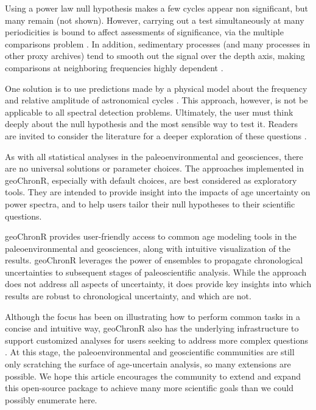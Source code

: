 \documentclass[gchron, manuscript]{copernicus}
\begin{document}
Using a power law null hypothesis makes a few cycles appear non
significant, but many remain (not shown). However, carrying out a test
simultaneously at many periodicities is bound to affect assessments of
significance, via the multiple comparisons problem
\citep{Vaughan_PP2011}. In addition, sedimentary processes (and many
processes in other proxy archives) tend to smooth out the signal over
the depth axis, making comparisons at neighboring frequencies highly
dependent \citep{Meyers_2012}.

One solution is to use predictions made by a physical model about the
frequency and relative amplitude of astronomical cycles
\citep{MeyersSageman_2007}. This approach, however, is not be applicable
to all spectral detection problems. Ultimately, the user must think
deeply about the null hypothesis and the most sensible way to test it.
Readers are invited to consider the literature for a deeper exploration
of these questions
\citep[e.g.,][]{Vaughan_PP2011, Meyers_2012, Meyers_2015, MeyersMalinverno2018}.

As with all statistical analyses in the paleoenvironmental and
geosciences, there are no universal solutions or parameter choices. The
approaches implemented in geoChronR, especially with default choices,
are best considered as exploratory tools. They are intended to provide
insight into the impacts of age uncertainty on power spectra, and to
help users tailor their null hypotheses to their scientific questions.

\conclusions

geoChronR provides user-friendly access to common age modeling tools in
the paleoenvironmental and geosciences, along with intuitive
visualization of the results. geoChronR leverages the power of ensembles
to propagate chronological uncertainties to subsequent stages of
paleoscientific analysis. While the approach does not address all
aspects of uncertainty, it does provide key insights into which results
are robust to chronological uncertainty, and which are not.

Although the focus has been on illustrating how to perform common tasks
in a concise and intuitive way, geoChronR also has the underlying
infrastructure to support customized analyses for users seeking to
address more complex questions \citep[e.g.][]{thomas2018sikuiui}. At
this stage, the paleoenvironmental and geoscientific communities are
still only scratching the surface of age-uncertain analysis, so many
extensions are possible. We hope this article encourages the community
to extend and expand this open-source package to achieve many more
scientific goals than we could possibly enumerate here.
\end{document}
